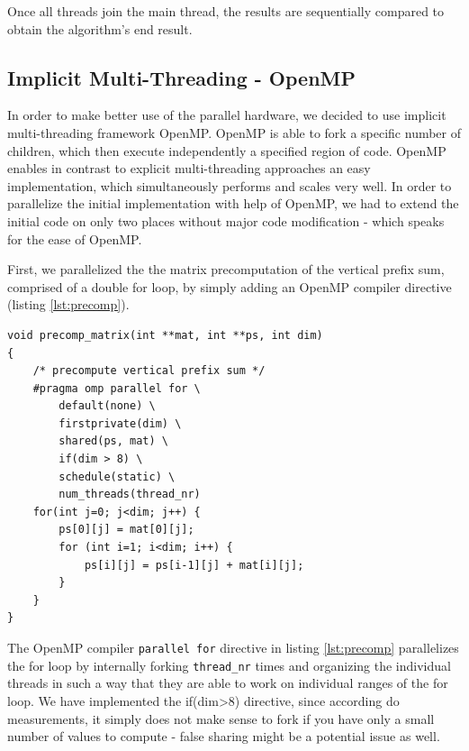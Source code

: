 \documentclass[conference]{IEEEtran}
\begin{document}
Once all threads join the main thread, the results are sequentially compared to obtain the algorithm's end result.

\subsection{Implicit Multi-Threading - OpenMP}
\label{sec:impl:openmp}

In order to make better use of the parallel hardware, we decided to use implicit multi-threading framework OpenMP. OpenMP is able to fork a specific number of children, which then execute independently a specified region of code. OpenMP enables in contrast to explicit multi-threading approaches an easy implementation, which simultaneously performs and scales very well. In order to parallelize the initial implementation with help of OpenMP, we had to extend the initial code on only two places without major code modification - which speaks for the ease of OpenMP. 

First, we parallelized the the matrix precomputation of the vertical prefix sum, comprised of a double for loop, by simply adding an OpenMP compiler directive (listing \ref{lst:precomp}).

\begin{center}
   \begin{lstlisting}[captionpos=b, caption=OpenMP: Parallel Matrix Pre-Computation of the Vertical Sum, label=lst:precomp]                                            
void precomp_matrix(int **mat, int **ps, int dim)                                  
{                                             
    /* precompute vertical prefix sum */  
    #pragma omp parallel for \ 
        default(none) \        
        firstprivate(dim) \    
        shared(ps, mat) \      
        if(dim > 8) \          
        schedule(static) \     
        num_threads(thread_nr)     
    for(int j=0; j<dim; j++) {                
        ps[0][j] = mat[0][j];                 
        for (int i=1; i<dim; i++) {           
            ps[i][j] = ps[i-1][j] + mat[i][j];
        }                                     
    }                                         
}                                             
   \end{lstlisting}
\end{center}

The OpenMP compiler \texttt{parallel for} directive in listing \ref{lst:precomp} parallelizes the for loop by internally forking \texttt{thread\_nr} times and organizing the individual threads in such a way that they are able to work on individual ranges of the for loop. We have implemented the if(dim>8) directive, since according do measurements, it simply does not make sense to fork if you have only a small number of values to compute - false sharing might be a potential issue as well. 
\end{document}
